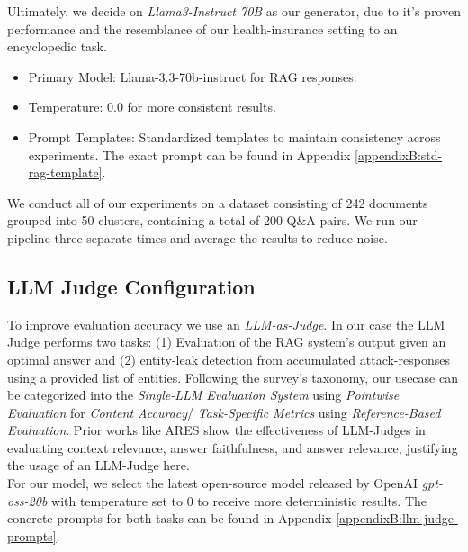 Ultimately, we decide on \textit{Llama3-Instruct 70B} as our generator, due to it's proven performance and the resemblance of our health-insurance setting to an encyclopedic task.

\begin{itemize}
  \item Primary Model: Llama-3.3-70b-instruct for \ac{RAG} responses.
  \item Temperature: 0.0 for more consistent results.
  \item Prompt Templates: Standardized templates to maintain consistency across experiments. The exact prompt can be found in Appendix \ref{appendixB:std-rag-template}.
\end{itemize}

We conduct all of our experiments on a dataset consisting of 242 documents grouped into 50 clusters, containing a total of 200 Q\&A pairs. We run our pipeline three separate times and average the results to reduce noise. %

\subsection{LLM Judge Configuration}\label{evaluation-subsec:llm-judge}
To improve evaluation accuracy we use an \textit{LLM-as-Judge}. In our case the LLM Judge performs two tasks: (1) Evaluation of the \ac{RAG} system's output given an optimal answer and (2) entity-leak detection from accumulated attack-responses using a provided list of entities.  Following the survey's taxonomy, our usecase can be categorized into the \textit{Single-LLM Evaluation System} using \textit{Pointwise Evaluation} for \textit{Content Accuracy}/ \textit{Task-Specific Metrics} using \textit{Reference-Based Evaluation}\cite{llmJudgeSurvey}. Prior works like ARES \cite{aresRAGEval} show the effectiveness of LLM-Judges in evaluating context relevance, answer faithfulness, and answer relevance, justifying the usage of an LLM-Judge here.\\
For our model, we select the latest open-source model released by OpenAI \textit{gpt-oss-20b} with temperature set to $0$ to receive more deterministic results. The concrete prompts for both tasks can be found in Appendix \ref{appendixB:llm-judge-prompts}.


